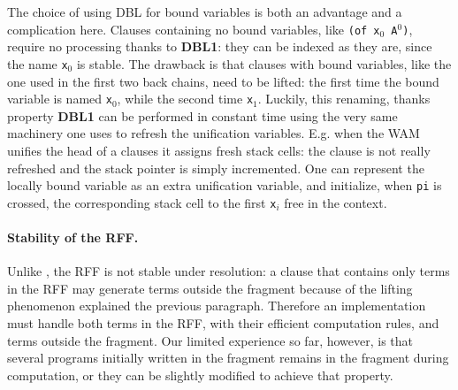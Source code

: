 \documentclass{llncs}
\begin{document}
The choice of using DBL for bound variables is both an advantage and a
complication here.
Clauses containing no bound variables, like
\verb+(of x+$_0$\verb+ A+$^0$\verb+)+, require no processing thanks to
\textbf{DBL1}: they can be indexed as they are, since the name \verb+x+$_0$
is stable.
The drawback is that clauses with bound variables, like the one 
used in the first two back chains, need to be lifted: the first time the
bound variable is named \verb+x+$_0$,
while the second time \verb+x+$_1$.
Luckily, this renaming, thanks property \textbf{DBL1}
can be performed in constant time using the very same machinery one uses to
refresh the unification variables.
E.g. when the WAM unifies the head of a clauses it assigns 
fresh stack cells: the clause is not really refreshed and the stack
pointer is simply incremented.  One can represent the locally bound variable as
an extra unification variable, and initialize, when \verb+pi+ is crossed, the
corresponding stack cell to the first \verb+x+$_i$ free in the context.

\paragraph{Stability of the RFF.}
Unlike \Ll{}, the RFF is not stable under \lp{} resolution:
a clause that contains only terms in the RFF
may generate terms
outside the fragment
because
of the lifting phenomenon explained the previous paragraph.
Therefore an implementation must handle both terms in the RFF, with their
efficient computation rules, and terms outside the fragment. Our limited
experience so far, however, is that several programs initially written in the
fragment remains in the fragment during computation, or they can be slightly
modified to achieve that property.
\end{document}
